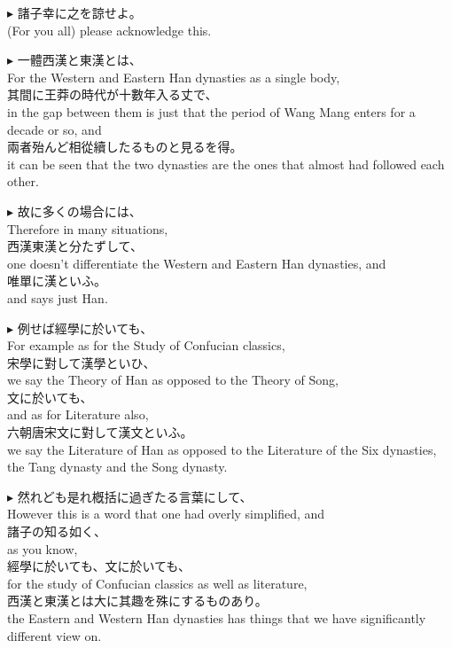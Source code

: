 \documentclass{ctexart}
\makeatletter
\newcommand*{\shifttext}[1]{%
  \settowidth{\@tempdima}{#1}%
  \hspace{-\@tempdima}#1%
}
\newcommand{\plabel}[1]{%
\shifttext{\textbf{#1}\quad}%
}
\newcommand{\prule}{%
\begin{center}%
\hdashrule[0.5ex]{.99\linewidth}{1pt}{1pt 2.5pt}%
\end{center}%
}
\makeatother
\begin{document}
\vspace{1em}
\plabel{$\blacktriangleright$}%
諸子幸に之を諒せよ。\\
(For you all) please acknowledge this.

\prule

\plabel{$\blacktriangleright$}%
一體西漢と東漢とは、\\
For the Western and Eastern Han dynasties as a single body,\\
其間に王莽の時代が十數年入る丈で、\\
in the gap between them is just that the period of Wang Mang enters for a decade or so, and\\
兩者殆んど相從續したるものと見るを得。\\
it can be seen that the two dynasties are the ones that almost had followed each other.

\vspace{1em}
\plabel{$\blacktriangleright$}%
故に多くの場合には、\\
Therefore in many situations,\\
西漢\textperiodcentered 東漢と分たずして、\\
one doesn't differentiate the Western and Eastern Han dynasties, and\\
唯單に漢といふ。\\
and says just Han.

\vspace{1em}
\plabel{$\blacktriangleright$}%
例せば經學に於いても、\\
For example as for the Study of Confucian classics,\\
宋學に對して漢學といひ、\\
we say the Theory of Han as opposed to the Theory of Song,\\
文に於いても、\\
and as for Literature also,\\
六朝\textperiodcentered 唐\textperiodcentered 宋文に對して漢文といふ。\\
we say the Literature of Han as opposed to the Literature of the Six dynasties, the Tang dynasty and the Song dynasty.

\vspace{1em}
\plabel{$\blacktriangleright$}%
然れども是れ槪括に過ぎたる言葉にして、\\
However this is a word that one had overly simplified, and\\
諸子の知る如く、\\
as you know,\\
經學に於いても、文に於いても、\\
for the study of Confucian classics as well as literature,\\
西漢と東漢とは大に其趣を殊にするものあり。\\
the Eastern and Western Han dynasties has things that we have significantly different view on.
\end{document}
